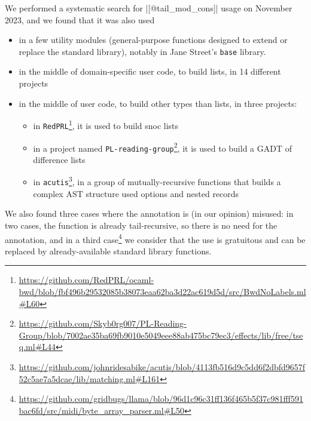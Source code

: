 We performed a systematic search for \ocaml|[@tail_mod_cons]| usage on November 2023, and we found that it was also used
\begin{itemize}
\item in a few utility modules (general-purpose functions designed to extend or replace the standard library), notably in Jane Street's \texttt{base} library.
\item in the middle of domain-specific user code, to build lists, in 14 different projects
\item in the middle of user code, to build other types than lists, in three projects:
  \begin{itemize}
  \item in \texttt{RedPRL}\footnote{\url{https://github.com/RedPRL/ocaml-bwd/blob/fbf496b29532085b38073eaa62ba3d22ac619d5d/src/BwdNoLabels.ml\#L60}},
    it is used to build snoc lists
  \item in a project named \texttt{PL-reading-group}\footnote{\url{https://github.com/Skyb0rg007/PL-Reading-Group/blob/7002ae35ba69fb9010e5049eee88ab475bc79ec3/effects/lib/free/tseq.ml\#L44}},
    it is used to build a GADT of difference lists
  \item in \texttt{acutis}\footnote{\url{https://github.com/johnridesabike/acutis/blob/4113fb516d9c5dd6f2dbfd9657f52c5ae7a5dcae/lib/matching.ml\#L161}},
    in a group of mutually-recursive functions that builds a complex AST structure used options and nested records
  \end{itemize}
\end{itemize}

We also found three cases where the annotation is (in our opinion) misused: in two cases, the function is already tail-recursive, so there is no need for the annotation, and in a third case\footnote{\url{https://github.com/gridbugs/llama/blob/96d1c96c31ff136f465b5f37c981fff591bac6fd/src/midi/byte_array_parser.ml\#L50}} we consider that the use is gratuitous and can be replaced by already-available standard library functions.

